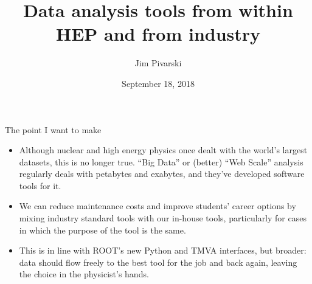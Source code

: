 \documentclass[aspectratio=169]{beamer}
\title[2018-09-18-jlab-reprise]{Data analysis tools from within HEP and from industry}
\author{Jim Pivarski}
\institute{Princeton University -- DIANA-HEP}
\date{September 18, 2018}
\begin{document}

\begin{frame}
  \titlepage
\end{frame}




\begin{frame}{The point I want to make}
\large
\vspace{0.5 cm}
\begin{itemize}\setlength{\itemsep}{0.25 cm}
\item Although nuclear and high energy physics once dealt with the world's largest datasets, this is no longer true. ``Big Data'' or (better) ``Web Scale'' analysis regularly deals with petabytes and exabytes, and they've developed software tools for it.

\item<2-> We can reduce maintenance costs and improve students' career options by mixing industry standard tools with our in-house tools, particularly for cases in which the purpose of the tool is the same.

\item<3-> This is in line with ROOT's new Python and TMVA interfaces, but broader: data should flow freely to the best tool for the job and back again, leaving the choice in the physicist's hands.
\end{itemize}

\end{frame}
\end{document}
